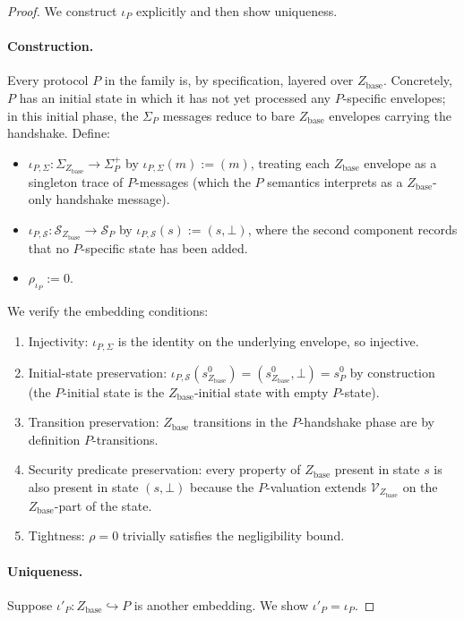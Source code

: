 \documentclass[11pt]{article}
\theoremstyle{definition}
\theoremstyle{remark}
\newcommand{\Zb}{Z_{\mathrm{base}}}
\begin{document}
\begin{proof}
We construct $\iota_P$ explicitly and then show uniqueness.

\paragraph{Construction.}
Every protocol $P$ in the family is, by specification, layered over
$\Zb$. Concretely, $P$ has an initial state in which it has not yet
processed any $P$-specific envelopes; in this initial phase, the
$\Sigma_P$ messages reduce to bare $\Zb$ envelopes carrying the
handshake. Define:
\begin{itemize}
\item $\iota_{P,\Sigma} : \Sigma_{\Zb} \to \Sigma_P^+$ by
$\iota_{P,\Sigma}(m) := (m)$, treating each $\Zb$ envelope as a
singleton trace of $P$-messages (which the $P$ semantics interprets
as a $\Zb$-only handshake message).
\item $\iota_{P,\mathcal{S}} : \mathcal{S}_{\Zb} \to \mathcal{S}_P$
by $\iota_{P,\mathcal{S}}(s) := (s, \bot)$, where the second
component records that no $P$-specific state has been added.
\item $\rho_{\iota_P} := 0$.
\end{itemize}

We verify the embedding conditions:
\begin{enumerate}
\item Injectivity: $\iota_{P,\Sigma}$ is the identity on the
underlying envelope, so injective.
\item Initial-state preservation: $\iota_{P,\mathcal{S}}(s^0_{\Zb}) =
(s^0_{\Zb}, \bot) = s^0_P$ by construction (the $P$-initial state is
the $\Zb$-initial state with empty $P$-state).
\item Transition preservation: $\Zb$ transitions in the $P$-handshake
phase are by definition $P$-transitions.
\item Security predicate preservation: every property of $\Zb$
present in state $s$ is also present in state $(s, \bot)$ because the
$P$-valuation extends $\mathcal{V}_{\Zb}$ on the $\Zb$-part of the
state.
\item Tightness: $\rho = 0$ trivially satisfies the negligibility
bound.
\end{enumerate}

\paragraph{Uniqueness.}
Suppose $\iota'_P : \Zb \hookrightarrow P$ is another embedding. We
show $\iota'_P = \iota_P$.


\end{proof}
\end{document}
